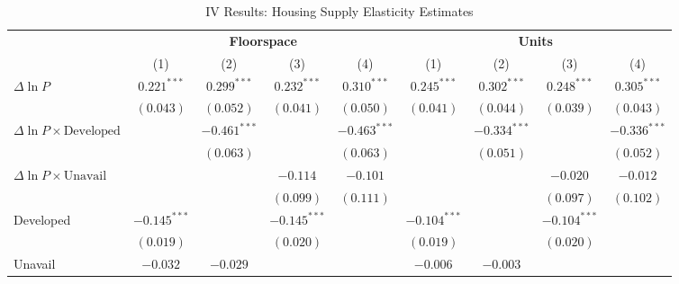
\begin{table}
\caption{IV Results: Housing Supply Elasticity Estimates}
\begin{center}
\begin{footnotesize}
\begin{threeparttable}
\begin{tabular}{l@{} c@{} c@{} c@{} c@{} c@{} c@{} c@{} c@{}}
\toprule
 & \multicolumn{4}{c}{\textbf{Floorspace}} & \multicolumn{4}{c}{\textbf{Units}} \\
\cmidrule(lr){2-5} \cmidrule(lr){6-9}
 & (1) & (2) & (3) & (4) & (1) & (2) & (3) & (4) \\
\midrule
$\Delta\ln P$                         & $0.221^{***}$  & $0.299^{***}$  & $0.232^{***}$  & $0.310^{***}$  & $0.245^{***}$  & $0.302^{***}$  & $0.248^{***}$  & $0.305^{***}$  \\
                                      & $(0.043)$      & $(0.052)$      & $(0.041)$      & $(0.050)$      & $(0.041)$      & $(0.044)$      & $(0.039)$      & $(0.043)$      \\
$\Delta\ln P\times{\text{Developed}}$ &                & $-0.461^{***}$ &                & $-0.463^{***}$ &                & $-0.334^{***}$ &                & $-0.336^{***}$ \\
                                      &                & $(0.063)$      &                & $(0.063)$      &                & $(0.051)$      &                & $(0.052)$      \\
$\Delta\ln P\times{\text{Unavail}}$   &                &                & $-0.114$       & $-0.101$       &                &                & $-0.020$       & $-0.012$       \\
                                      &                &                & $(0.099)$      & $(0.111)$      &                &                & $(0.097)$      & $(0.102)$      \\
Developed                             & $-0.145^{***}$ &                & $-0.145^{***}$ &                & $-0.104^{***}$ &                & $-0.104^{***}$ &                \\
                                      & $(0.019)$      &                & $(0.020)$      &                & $(0.019)$      &                & $(0.020)$      &                \\
Unavail                               & $-0.032$       & $-0.029$       &                &                & $-0.006$       & $-0.003$       &                &                \\

\end{tabular}
\end{threeparttable}
\end{footnotesize}
\end{center}
\end{table}
